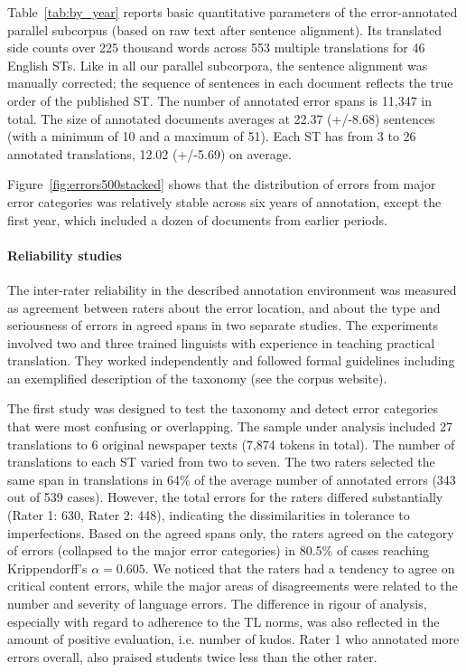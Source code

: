 Table~\ref{tab:by_year} reports basic quantitative parameters of the error-annotated parallel subcorpus (based on raw text after sentence alignment). Its translated side counts over 225 thousand words across 553 multiple translations for 46 English STs. Like in all our parallel subcorpora, the sentence alignment was manually corrected; the sequence of sentences in each document reflects the true order of the published ST. The number of annotated error spans is 11,347 in total. The size of annotated documents averages at 22.37 (+/-8.68) sentences (with a minimum of 10 and a maximum of 51). Each ST has from 3 to 26 annotated translations, 12.02 (+/-5.69) on average.

Figure~\ref{fig:errors500stacked} shows that the distribution of errors from major error categories was relatively stable across six years of annotation, except the first year, which included a dozen of documents from earlier periods. 


\paragraph{Reliability studies}
The inter-rater reliability in the described annotation environment was measured as agreement between raters about the error location, and about the type and seriousness of errors in agreed spans in two separate studies. The experiments involved two and three trained linguists with experience in teaching practical translation. They worked independently and followed formal guidelines including an exemplified description of the taxonomy (see the corpus website).

The first study was designed to test the taxonomy and detect error categories that were most confusing or overlapping. The sample under analysis included 27 translations to 6 original newspaper texts (7,874 tokens in total). The number of translations to each ST varied from two to seven.
The two raters selected the same span in translations in 64\% of the average number of annotated errors (343 out of 539 cases). However, the total errors for the raters differed substantially (Rater 1: 630, Rater 2: 448), indicating the dissimilarities in tolerance to imperfections. 
Based on the agreed spans only, the raters agreed on the category of errors (collapsed to the major error categories) in 80.5\% of cases reaching Krippendorff's $\alpha=0.605$. %
We noticed that the raters had a tendency to agree on critical content errors, while the major areas of disagreements were related to the number and severity of language errors. The difference in rigour of analysis, especially with regard to adherence to the TL norms, was also reflected in the amount of positive evaluation, i.e. number of kudos. Rater 1 who annotated more errors overall, also praised students twice less than the other rater. 

